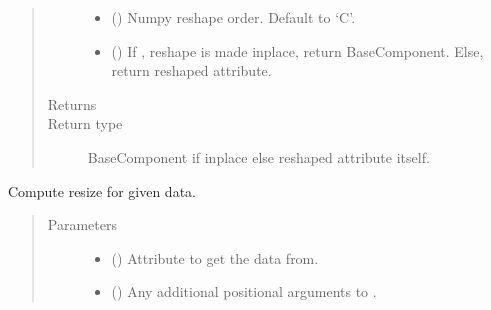 \documentclass[letterpaper,10pt,english]{sphinxmanual}
\begin{document}
\begin{fulllineitems}
\begin{fulllineitems}
\begin{quote}
\begin{description}
\begin{itemize}
\item {} 
 () \textendash{} Numpy reshape order. Default to ‘C’.

\item {} 
 () \textendash{} If , reshape is made inplace, return BaseComponent.
Else, return reshaped attribute.

\end{itemize}

\item[{Returns}] \leavevmode
{}

\item[{Return type}] \leavevmode
BaseComponent if inplace else reshaped attribute itself.

\end{description}\end{quote}

\end{fulllineitems}


\begin{fulllineitems}
\label{\detokenize{api/rock:geology.src.Rock.resize}}
Compute resize for given data.
\begin{quote}\begin{description}
\item[{Parameters}] \leavevmode\begin{itemize}
\item {} 
 (\sphinxstyleliteralemphasis{\sphinxupquote{, }}) \textendash{} Attribute to get the data from.

\item {} 
 () \textendash{} Any additional positional arguments to .


\end{itemize}
\end{description}
\end{quote}
\end{fulllineitems}
\end{fulllineitems}
\end{document}
